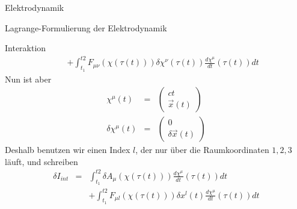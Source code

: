 \begin{chapter}{\titlestr}
\begin{section}{Elektrodynamik}
\begin{subsection}{Lagrange-Formulierung der Elektrodynamik}
\begin{subsubsection}{Interaktion}
\begin{eqnarray*}
&&+\int_{t_1}^{t2} F_{\mu\nu}(\chi(\tau(t)))\delta\chi^\nu(\tau(t))\frac{d\chi^\mu}{dt}(\tau(t))dt
\end{eqnarray*}
Nun ist aber
\begin{eqnarray*}
\chi^\mu(t) &=& \begin{pmatrix}
ct\\
\vec{x}(t)
\end{pmatrix}\\
\delta \chi^\mu(t) &=& \begin{pmatrix}
0\\
\delta \vec{x}(t)
\end{pmatrix}
\end{eqnarray*}
Deshalb benutzen wir einen Index $l$, der nur über die Raumkoordinaten $1,2,3$ läuft, und schreiben
\begin{eqnarray*}
\delta I_{int} &=& \int_{t_1}^{t2} \delta A_\mu(\chi(\tau(t)))\frac{d\chi^\mu}{dt}(\tau(t))dt\\
&&+\int_{t_1}^{t2} F_{\mu l}(\chi(\tau(t)))\delta x^l(t)\frac{d\chi^\mu}{dt}(\tau(t))dt
\end{eqnarray*}
\end{subsubsection}


\end{subsection}
\end{section}
\end{chapter}
